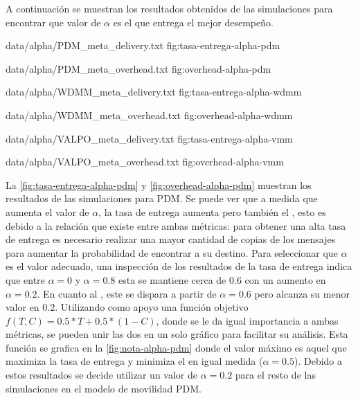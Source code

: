 

A continuación se muestran los resultados obtenidos de las simulaciones para
encontrar que valor de $\alpha$ es el que entrega el mejor desempeño.




{
{data/alpha/PDM_meta_delivery.txt}
}{fig:tasa-entrega-alpha-pdm}

{
{data/alpha/PDM_meta_overhead.txt}
}{fig:overhead-alpha-pdm}


{
{data/alpha/WDMM_meta_delivery.txt}
}{fig:tasa-entrega-alpha-wdmm}

{
{data/alpha/WDMM_meta_overhead.txt}
}{fig:overhead-alpha-wdmm}


{
{data/alpha/VALPO_meta_delivery.txt}
}{fig:tasa-entrega-alpha-vmm}

{
{data/alpha/VALPO_meta_overhead.txt}
}{fig:overhead-alpha-vmm}


La \ref{fig:tasa-entrega-alpha-pdm} y \ref{fig:overhead-alpha-pdm} muestran los
resultados de las simulaciones para PDM. Se puede ver que a medida que aumenta
el valor de $\alpha$, la tasa de entrega aumenta pero también el \overhead{},
esto es debido a la relación que existe entre ambas métricas: para obtener una
alta tasa de entrega es necesario realizar una mayor cantidad de copias de los
mensajes para aumentar la probabilidad de encontrar a su destino. Para
seleccionar que $\alpha$ es el valor adecuado, una inspección de los resultados
de la tasa de entrega indica que entre $\alpha = 0$ y $\alpha =0.8$ esta se
mantiene cerca de $0.6$ con un aumento en $\alpha = 0.2$. En cuanto al
\overhead, este se dispara a partir de $\alpha = 0.6$ pero alcanza su menor
valor en $0.2$. Utilizando como apoyo una función objetivo $f(T, C) = 0.5*T +
0.5*(1 - C)$, donde se le da igual importancia a ambas métricas, se pueden unir
las dos en un solo gráfico para facilitar su análisis. Esta función se grafica
en la \ref{fig:nota-alpha-pdm} donde el valor máximo es aquel que maximiza la
tasa de entrega y minimiza el \overhead{} en igual medida ($\alpha = 0.5$).
Debido a estos resultados se decide utilizar un valor de $\alpha = 0.2$ para el
resto de las simulaciones en el modelo de movilidad PDM.



